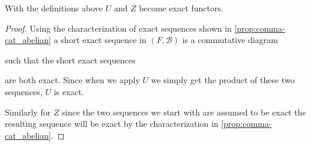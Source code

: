\begin{prop}
	With the definitions above $U$ and $Z$ become exact functors.
	\begin{proof}
		Using the characterization of exact sequences shown in \cref{prop:comma-cat_abelian} a short exact sequence in $(F, \mathcal B)$ is a commutative diagram
		\begin{center}
		\end{center}
		such that the short exact sequences 
		\begin{center}
		\end{center}
		are both exact. Since when we apply $U$ we simply get the product of these two sequences, $U$ is exact.
		
		Similarly for $Z$ since the two sequences we start with are assumed to be exact the resulting sequence will be exact by the characterization in \cref{prop:comma-cat_abelian}.
	\end{proof}
\end{prop}

